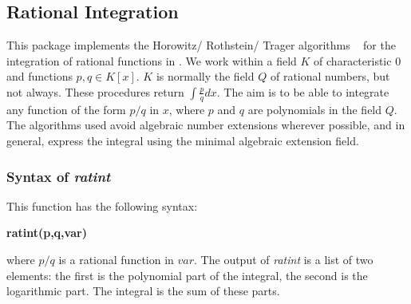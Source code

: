 
\subsection{Rational Integration}

This package implements the Horowitz/ Rothstein/ Trager algorithms ~\cite{Geddes:92} for the integration of rational functions in \REDUCE. We work within a field $K$ of characteristic $0$ and functions $p,q \in K[x]$. $K$ is normally the field $Q$ of rational numbers, but not always. These procedures return $\int \frac{p}{q} dx.$
 The aim is to be able to integrate any function of the form $p/q$ in $x$, where $p$ and $q$ are polynomials in the field $Q$. The algorithms used avoid algebraic number extensions wherever possible, and in general, express the integral using the minimal algebraic extension field.

\subsubsection{Syntax of \emph{ratint}}
This function has the following syntax:
\begin{center} \textbf{ratint(p,q,var)} \end{center}
where $p/q$ is a rational function in $var$. The output of \emph{ratint} is a list of two elements: the first is the polynomial part of the integral, the second is the logarithmic part. The integral is the sum of these parts.
